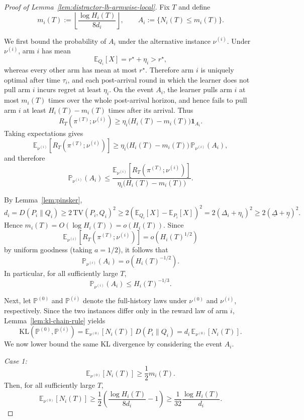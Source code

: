 \documentclass[11pt]{article}
\begin{document}
\begin{proof}[Proof of Lemma~\ref{lem:distractor-lb-armwise-local}]
Fix $T$ and define
\[
m_i(T):=\left\lfloor \frac{\log H_i(T)}{8d_i}\right\rfloor,
\qquad
A_i:=\{N_i(T)\le m_i(T)\}.
\]

We first bound the probability of $A_i$ under the alternative instance
$\nu^{(i)}$. Under $\nu^{(i)}$, arm $i$ has mean
\[
\mathbb E_{Q_i}[X]=r^\star+\eta_i>r^\star,
\]
whereas every other arm has mean at most $r^\star$. Therefore arm $i$ is
uniquely optimal after time $\tau_i$, and each post-arrival round in which the
learner does not pull arm $i$ incurs regret at least $\eta_i$. On the event
$A_i$, the learner pulls arm $i$ at most $m_i(T)$ times over the whole
post-arrival horizon, and hence fails to pull arm $i$ at least
$H_i(T)-m_i(T)$ times after its arrival. Thus
\[
R_T(\pi^{(T)};\nu^{(i)})
\ge
\eta_i\bigl(H_i(T)-m_i(T)\bigr)\mathbf 1_{A_i}.
\]
Taking expectations gives
\[
\mathbb E_{\nu^{(i)}}[R_T(\pi^{(T)};\nu^{(i)})]
\ge
\eta_i\bigl(H_i(T)-m_i(T)\bigr)\,\mathbb P_{\nu^{(i)}}(A_i),
\]
and therefore
\[
\mathbb P_{\nu^{(i)}}(A_i)
\le
\frac{\mathbb E_{\nu^{(i)}}[R_T(\pi^{(T)};\nu^{(i)})]}
{\eta_i\bigl(H_i(T)-m_i(T)\bigr)}.
\]

By Lemma~\ref{lem:pinsker},
\[
d_i
=
D(P_i\|Q_i)
\ge
2\,\mathrm{TV}(P_i,Q_i)^2
\ge
2\left(\mathbb E_{Q_i}[X]-\mathbb E_{P_i}[X]\right)^2
=
2(\Delta_i+\eta_i)^2
\ge
2(\underline\Delta+\underline\eta)^2.
\]
Hence $m_i(T)=O(\log H_i(T))=o(H_i(T))$. Since
\[
\mathbb E_{\nu^{(i)}}[R_T(\pi^{(T)};\nu^{(i)})]
=
o(H_i(T)^{1/2})
\]
by uniform goodness (taking $a=1/2$), it follows that
\[
\mathbb P_{\nu^{(i)}}(A_i)=o(H_i(T)^{-1/2}).
\]
In particular, for all sufficiently large $T$,
\begin{equation}
\mathbb P_{\nu^{(i)}}(A_i)\le H_i(T)^{-1/3}.
\label{eq:distractor-armwise-A1}
\end{equation}

Next, let $\mathbb P^{(0)}$ and $\mathbb P^{(i)}$ denote the full-history laws
under $\nu^{(0)}$ and $\nu^{(i)}$, respectively. Since the two instances differ
only in the reward law of arm $i$, Lemma~\ref{lem:kl-chain-rule} yields
\begin{equation}
\mathrm{KL}(\mathbb P^{(0)},\mathbb P^{(i)})
=
\mathbb E_{\nu^{(0)}}[N_i(T)]\,D(P_i\|Q_i)
=
d_i\,\mathbb E_{\nu^{(0)}}[N_i(T)].
\label{eq:distractor-armwise-A2}
\end{equation}
We now lower bound the same KL divergence by considering the event $A_i$.

\medskip
\noindent
\textit{Case 1:}
\[
\mathbb E_{\nu^{(0)}}[N_i(T)]\ge \frac12 m_i(T).
\]
Then, for all sufficiently large $T$,
\[
\mathbb E_{\nu^{(0)}}[N_i(T)]
\ge
\frac12\left(\frac{\log H_i(T)}{8d_i}-1\right)
\ge
\frac{1}{32}\frac{\log H_i(T)}{d_i}.
\]


\end{proof}
\end{document}
